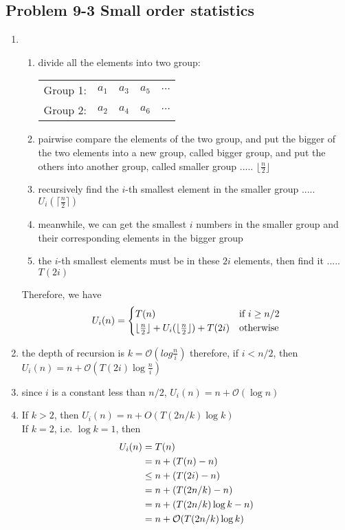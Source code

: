\subsection*{Problem 9-3 Small order statistics}
\begin{enumerate}
	\item	\begin{enumerate}
			\item	divide all the elements into two group: \\
				\begin{tabular}{lllll}
					Group 1: & $a_1$ & $a_3$ & $a_5$ & $\cdots$ \\
					Group 2: & $a_2$ & $a_4$ & $a_6$ & $\cdots$ \\
				\end{tabular}
			\item	pairwise compare the elements of the two group, and put the bigger of the two elements into a new group, called bigger group, and put the others into another group, called smaller group ..... $\lfloor \frac{n}{2} \rfloor$
			\item	recursively find the $i$-th smallest element in the smaller group ..... $U_i(\lceil \frac{n}{2} \rceil)$
			\item	meanwhile, we can get the smallest $i$ numbers in the smaller group and their corresponding elements in the bigger group
			\item	the $i$-th smallest elements must be in these $2i$ elements, then find it ..... $T(2i)$
		\end{enumerate}
		Therefore, we have
		\begin{equation} \notag
			U_i(n) = \begin{cases}
				T(n) & $if $ i \geq n / 2 \\
				\lfloor \frac{n}{2} \rfloor + U_i(\lfloor \frac{n}{2} \rfloor) + T(2i) & $otherwise$
			\end{cases}
		\end{equation}
	\item	the depth of recursion is $k = \mathcal{O}(log \frac{n}{i})$
		therefore, if $i < n / 2$, then $U_i(n) = n + \mathcal{O}(T(2i) \log \frac{n}{i})$
	\item	since $i$ is a constant less than $n / 2$, $U_i(n) = n + \mathcal{O}(\log n)$
	\item	If $k > 2$, then $U_i(n) = n + O(T(2n / k) \log k)$ \\
		If $k = 2$, i.e. $\log k = 1$, then
		\begin{equation} \notag
		\begin{aligned}
			U_i(n)  & = T(n) \\
				& = n + (T(n) - n) \\
				& \leq n + (T(2i) - n) \\
				& = n + (T(2n / k) - n) \\
				& = n + (T(2n / k) \log k - n) \\
				& = n + \mathcal{O}(T(2n / k) \log k)
		\end{aligned}
		\end{equation}
\end{enumerate}

